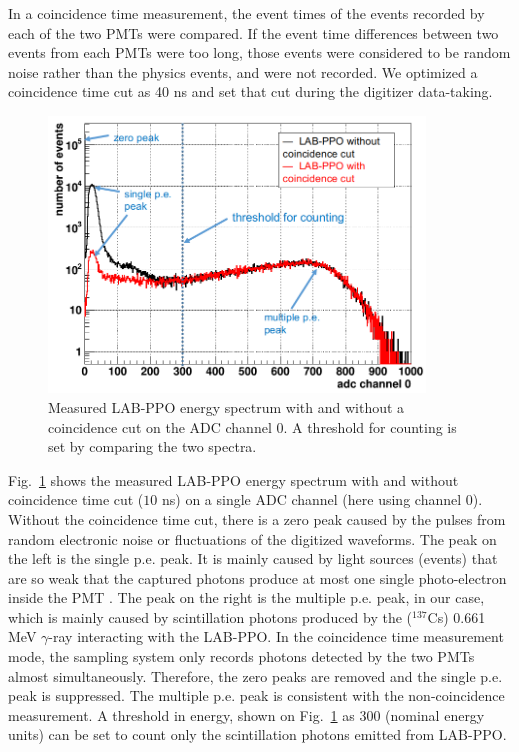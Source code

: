 In a coincidence time measurement, the event times of the events recorded by each of the two PMTs were compared. If the event time differences between two events from each PMTs were too long, those events were considered to be random noise rather than the physics events, and were not recorded. We optimized a coincidence time cut as 40 ns and set that cut during the digitizer data-taking. 

\begin{figure}[htbp]
	\centering	
	\includegraphics[width=10cm]{TeLScoinCut.png}
	\caption[Measured LAB-PPO energy spectrum with and without coincidence cut]{Measured LAB-PPO energy spectrum with and without a coincidence cut on the ADC channel 0. A threshold for counting is set by comparing the two spectra.}
	\label{teLScoinCut}
\end{figure}

Fig.~\ref{teLScoinCut} shows the measured LAB-PPO energy spectrum with and without coincidence time cut ($10$ ns) on a single ADC channel (here using channel 0). Without the coincidence time cut, there is a zero peak caused by the pulses from random electronic noise or fluctuations of the digitized waveforms. The peak on the left is the single p.e. peak. It is mainly caused by light sources (events) that are so weak that the captured photons produce at most one single photo-electron inside the PMT \cite{leo2012techniques}. The peak on the right is the multiple p.e. peak, in our case, which is mainly caused by scintillation photons produced by the ($^{137}$Cs) 0.661 MeV $\gamma$-ray interacting with the LAB-PPO. In the coincidence time measurement mode, the sampling system only records photons detected by the two PMTs almost simultaneously. Therefore, the zero peaks are removed and the single p.e. peak is suppressed. The multiple p.e. peak is consistent with the non-coincidence measurement. A threshold in energy, shown on Fig.~\ref{teLScoinCut} as 300 (nominal energy units) can be set to count only the scintillation photons emitted from LAB-PPO. 


